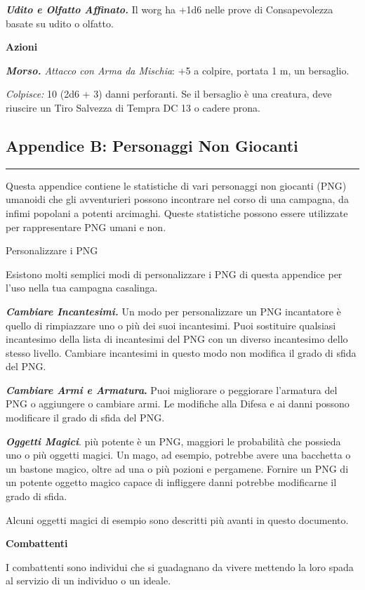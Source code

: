 \begin{multicols}{2}
{\emph{\textbf{Udito e Olfatto Affinato.}} Il worg ha +1d6 nelle prove di Consapevolezza basate su udito o olfatto.

\textbf{Azioni}

\emph{\textbf{Morso.} Attacco con Arma da Mischia}: +5 a colpire, portata 1 m, un bersaglio.

\emph{Colpisce:} 10 (2d6 + 3) danni perforanti. Se il bersaglio è una creatura, deve riuscire un Tiro Salvezza di Tempra DC 13 o cadere prona.

\subsection{Appendice B: Personaggi Non Giocanti}\noindent\rule{\linewidth}{2pt} 

Questa appendice contiene le statistiche di vari personaggi non giocanti (PNG) umanoidi che gli avventurieri possono incontrare nel corso di una campagna, da infimi popolani a potenti arcimaghi. Queste statistiche possono essere utilizzate per rappresentare PNG umani e non.

Personalizzare i PNG

Esistono molti semplici modi di personalizzare i PNG di questa appendice per l'uso nella tua campagna casalinga.

\emph{\textbf{Cambiare Incantesimi.}} Un modo per personalizzare un PNG incantatore è quello di rimpiazzare uno o più dei suoi incantesimi. Puoi sostituire qualsiasi incantesimo della lista di
incantesimi del PNG con un diverso incantesimo dello stesso livello. Cambiare incantesimi in questo modo non modifica il grado di sfida del PNG.

\textbf{\emph{Cambiare Armi e Armatura}.} Puoi migliorare o peggiorare l'armatura del PNG o aggiungere o cambiare armi. Le modifiche alla Difesa e ai danni possono modificare il grado di sfida del PNG.

\emph{\textbf{Oggetti Magici}}. più potente è un PNG, maggiori le probabilità che possieda uno o più oggetti magici. Un mago, ad esempio, potrebbe avere una bacchetta o un bastone magico, oltre ad una o più pozioni e pergamene. Fornire un PNG di un potente oggetto magico capace di infliggere danni potrebbe modificarne il grado di sfida.

Alcuni oggetti magici di esempio sono descritti più avanti in questo documento.

\textbf{Combattenti}

I combattenti sono individui che si guadagnano da vivere mettendo la loro spada al servizio di un individuo o un ideale.

}
\end{multicols}
